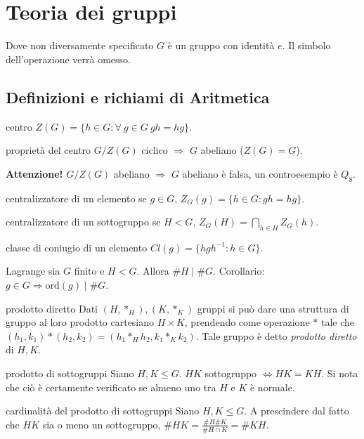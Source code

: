 \section{Teoria dei gruppi}

Dove non diversamente specificato $G$ è un gruppo con identità $e$. Il simbolo dell'operazione verrà omesso.

\subsection{Definizioni e richiami di Aritmetica}

\begin{definition}{centro}
    $Z(G) = \{h \in G : \forall \ g \in G \ gh = hg\}$.
\end{definition}
\begin{proposition}{proprietà del centro}
    $G/Z(G)$ ciclico $\Rightarrow$ $G$ abeliano ($Z(G) = G$).
    
    \textbf{Attenzione!} $G/Z(G)$ abeliano $\Rightarrow$ $G$ abeliano è falsa, un controesempio è $Q_8$.
\end{proposition}
\begin{definition}{centralizzatore di un elemento}
    se $g \in G$,  $Z_G(g) = \{h \in G : gh = hg\}$.
\end{definition}
\begin{definition}{centralizzatore di un sottogruppo}
    se $H < G$, $Z_G(H) = \bigcap_{h \in H} Z_G(h)$.
\end{definition}
\begin{definition}{classe di coniugio di un elemento}
    $Cl(g) = \{hgh^{-1} : h \in G \}$.
\end{definition}
\begin{theorem}{Lagrange}
    sia $G$ finito e $H< G$. Allora $\#H \mid \#G$. Corollario: $g \in G \Rightarrow \text{ord}(g) \mid \#G$.
\end{theorem}
\begin{definition}{prodotto diretto}
    Dati $(H,*_H), (K,*_K)$ gruppi si può dare una struttura di gruppo al loro prodotto cartesiano $H \times K$, prendendo come operazione $*$ tale che $(h_1,k_1)*(h_2,k_2) = (h_1*_Hh_2, k_1*_Kk_2)$. Tale gruppo è detto \textit{prodotto diretto} di $H, K$.
\end{definition}
\begin{proposition}{prodotto di sottogruppi}
    Siano $H,K \leq G$. $HK$ sottogruppo $\iff HK = KH$. Si nota che ciò è certamente verificato se almeno uno tra $H$ e $K$ è normale.
\end{proposition}
\begin{proposition}{cardinalità del prodotto di sottogruppi}
    Siano $H,K \leq G$. A prescindere dal fatto che $HK$ sia o meno un sottogruppo, $\#HK = \frac{\#H \#K}{\#H\cap K} = \#KH$.
\end{proposition} 

